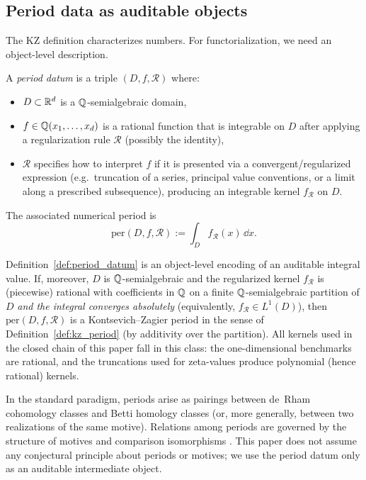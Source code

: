 \subsection{Period data as auditable objects}
\label{sec:perdatum_intro}

The KZ definition characterizes numbers. For functorialization, we need an object-level description.

\begin{definition}
\label{def:period_datum}
A \emph{period datum} is a triple $(D,f,\mathcal{R})$ where:
\begin{itemize}
\item $D\subset\mathbb{R}^d$ is a $\mathbb{Q}$-semialgebraic domain,
\item $f\in\mathbb{Q}(x_1,\dots,x_d)$ is a rational function that is integrable on $D$ after applying a regularization rule $\mathcal{R}$ (possibly the identity),
\item $\mathcal{R}$ specifies how to interpret $f$ if it is presented via a convergent/regularized expression (e.g.\ truncation of a series, principal value conventions, or a limit along a prescribed subsequence), producing an integrable kernel $f_{\mathcal{R}}$ on $D$.
\end{itemize}
The associated numerical period is
\begin{equation}
\label{eq:per_value}
\mathrm{per}(D,f,\mathcal{R}) := \int_D f_{\mathcal{R}}(x)\,\dd x.
\end{equation}
\end{definition}

\begin{remark}
\label{rem:perdatum_kz_condition}
Definition~\ref{def:period_datum} is an object-level encoding of an auditable integral value. If, moreover, $D$ is $\mathbb{Q}$-semialgebraic and the regularized kernel $f_{\mathcal{R}}$ is (piecewise) rational with coefficients in $\mathbb{Q}$ on a finite $\mathbb{Q}$-semialgebraic partition of $D$ \emph{and the integral converges absolutely} (equivalently, $f_{\mathcal{R}}\in L^1(D)$), then $\mathrm{per}(D,f,\mathcal{R})$ is a Kontsevich--Zagier period in the sense of Definition~\ref{def:kz_period} (by additivity over the partition).
All kernels used in the closed chain of this paper fall in this class: the one-dimensional benchmarks are rational, and the truncations used for zeta-values produce polynomial (hence rational) kernels.
\end{remark}

\begin{remark}
\label{rem:motivic_background}
In the standard paradigm, periods arise as pairings between de~Rham cohomology classes and Betti homology classes (or, more generally, between two realizations of the same motive). Relations among periods are governed by the structure of motives and comparison isomorphisms \cite{Andre2004,Deligne1982HodgeCycles}. This paper does not assume any conjectural principle about periods or motives; we use the period datum only as an auditable intermediate object.
\end{remark}

